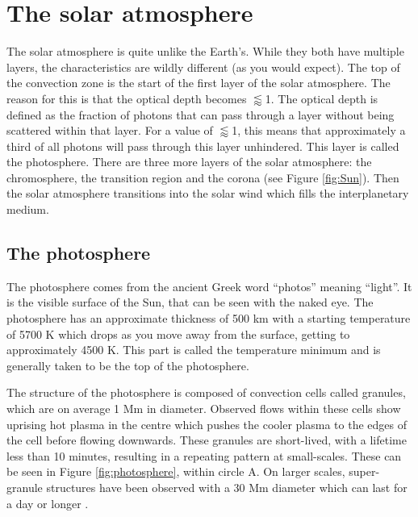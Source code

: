 \section{The solar atmosphere}
 
    The solar atmosphere is quite unlike the Earth's.
    While they both have multiple layers, the characteristics are wildly different (as you would expect). 
    The top of the convection zone is the start of the first layer of the solar atmosphere.
    The reason for this is that the optical depth becomes $\lessapprox$1.
    The optical depth is defined as the fraction of photons that can pass through a layer without being scattered within that layer.
    For a value of $\lessapprox$1, this means that approximately a third of all photons will pass through this layer unhindered.
    This layer is called the photosphere.
    There are three more layers of the solar atmosphere: the chromosphere, the transition region and the corona (see Figure \ref{fig:Sun}).
    Then the solar atmosphere transitions into the solar wind which fills the interplanetary medium.
    
\subsection{The photosphere}

    The photosphere comes from the ancient Greek word ``photos'' meaning ``light''.
    It is the visible surface of the Sun, that can be seen with the naked eye.
    The photosphere has an approximate thickness of 500 km with a starting temperature of 5700 K which drops as you move away from the surface, getting to approximately 4500 K.
    This part is called the temperature minimum and is generally taken to be the top of the photosphere.

    The structure of the photosphere is composed of convection cells called granules, which are on average 1 Mm in diameter.
    Observed flows within these cells show uprising hot plasma in the centre which pushes the cooler plasma to the edges of the cell before flowing downwards. 
    These granules are short-lived, with a lifetime less than 10 minutes, resulting in a repeating pattern at small-scales.
    These can be seen in Figure \ref{fig:photosphere}, within circle A.
    On larger scales, super-granule structures have been observed with a 30 Mm diameter which can last for a day or longer \citep{lrsp-2010-2}.
   
